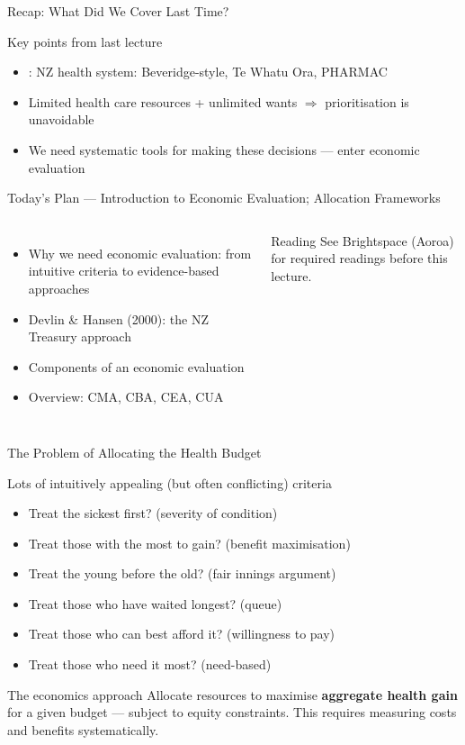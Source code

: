 \documentclass[aspectratio=169, 12pt]{beamer}
\newcommand{\recapslide}[1]{%
  \begin{frame}{Recap: What Did We Cover Last Time?}
    \begin{block}{Key points from last lecture}
      \begin{itemize}#1\end{itemize}
    \end{block}
  \end{frame}}
\newcommand{\planslide}[2]{%
  \begin{frame}{Today's Plan — #1}
    \begin{columns}
      \column{0.6\textwidth}
      \begin{itemize}#2\end{itemize}
      \column{0.38\textwidth}
      \begin{alertblock}{Reading}
        \footnotesize See Brightspace (Aoroa) for required readings before this lecture.
      \end{alertblock}
    \end{columns}
  \end{frame}}
\begin{document}
\recapslide{
  \item [From before break]: NZ health system: Beveridge-style, Te Whatu Ora, PHARMAC
  \item Limited health care resources + unlimited wants $\Rightarrow$ prioritisation is unavoidable
  \item We need systematic tools for making these decisions --- enter economic evaluation
}

\planslide{Introduction to Economic Evaluation; Allocation Frameworks}{
  \item Why we need economic evaluation: from intuitive criteria to evidence-based approaches
  \item Devlin \& Hansen (2000): the NZ Treasury approach
  \item Components of an economic evaluation
  \item Overview: CMA, CBA, CEA, CUA
}

\begin{frame}{The Problem of Allocating the Health Budget}
  \begin{block}{Lots of intuitively appealing (but often conflicting) criteria}
    \begin{itemize}
      \item Treat the sickest first? (severity of condition)
      \item Treat those with the most to gain? (benefit maximisation)
      \item Treat the young before the old? (fair innings argument)
      \item Treat those who have waited longest? (queue)
      \item Treat those who can best afford it? (willingness to pay)
      \item Treat those who need it most? (need-based)
    \end{itemize}
  \end{block}
  \vspace{0.3em}
  \begin{alertblock}{The economics approach}
    Allocate resources to maximise \textbf{aggregate health gain} for a given budget ---
    subject to equity constraints. This requires measuring costs and benefits systematically.
  \end{alertblock}
\end{frame}
\end{document}
